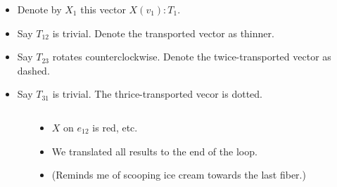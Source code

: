 \begin{frame}
\begin{columns}
\begin{column}{0.65\textwidth}
\vspace{12pt}
\begingroup
{}

\endgroup
\end{column}
\begin{column}{0.35\textwidth}
\begin{itemize}
\item<1-> Denote by \( X_1 \) this vector \( X(v_1):T_1 \).
\item<1-> Say \( T_{12} \) is trivial. Denote the transported vector as thinner.
\item<1-> Say \( T_{23} \) rotates counterclockwise. Denote the twice-transported vector as dashed.
\item<1-> Say \( T_{31} \) is trivial. The thrice-transported vecor is dotted.
\end{itemize}
\end{column}
\end{columns}
\end{frame}

\begin{frame}
\begin{columns}
\begin{column}{0.65\textwidth}
\vspace{12pt}
\begingroup
{}

\endgroup
\end{column}
\begin{column}{0.35\textwidth}
\begin{itemize}
\item<1-> \( X \) on \( e_{12} \) is red, etc.
\item<2-> We translated all results to the end of the loop.
\item<3-> (Reminds me of scooping ice cream towards the last fiber.)
\end{itemize}
\end{column}
\end{columns}
\end{frame}

